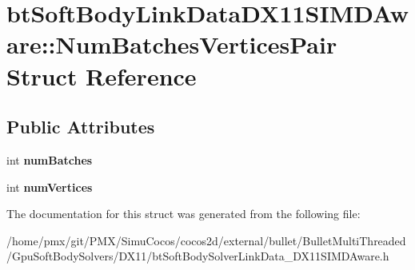 \hypertarget{structbtSoftBodyLinkDataDX11SIMDAware_1_1NumBatchesVerticesPair}{}\section{bt\+Soft\+Body\+Link\+Data\+D\+X11\+S\+I\+M\+D\+Aware\+:\+:Num\+Batches\+Vertices\+Pair Struct Reference}
\label{structbtSoftBodyLinkDataDX11SIMDAware_1_1NumBatchesVerticesPair}
\subsection*{Public Attributes}
\begin{DoxyCompactItemize}
\item 
\mbox{\label{structbtSoftBodyLinkDataDX11SIMDAware_1_1NumBatchesVerticesPair_aebdc90925a238865276c3b8890798604}} 
int {\bfseries num\+Batches}
\item 
\mbox{\label{structbtSoftBodyLinkDataDX11SIMDAware_1_1NumBatchesVerticesPair_a9a5924e0d081443b5467c3a37d52cada}} 
int {\bfseries num\+Vertices}
\end{DoxyCompactItemize}


The documentation for this struct was generated from the following file\+:\begin{DoxyCompactItemize}
\item 
/home/pmx/git/\+P\+M\+X/\+Simu\+Cocos/cocos2d/external/bullet/\+Bullet\+Multi\+Threaded/\+Gpu\+Soft\+Body\+Solvers/\+D\+X11/bt\+Soft\+Body\+Solver\+Link\+Data\+\_\+\+D\+X11\+S\+I\+M\+D\+Aware.\+h\end{DoxyCompactItemize}
